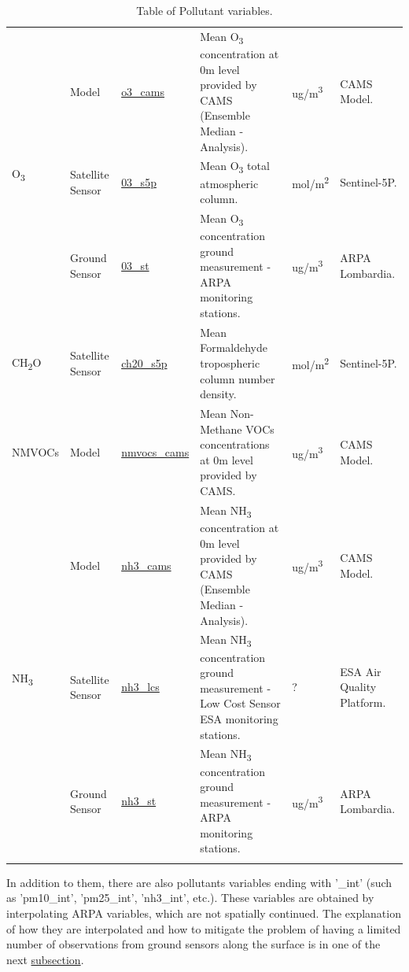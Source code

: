 \begin{center}
\begin{longtable}{ |p{2.3cm}|p{1.5cm}|p{2.3cm}|p{4cm}|p{1.2cm}|p{2.3cm}| }
\multirow{3}{4em}{O\textsubscript{3}} & Model  & \underline{o3\_cams} & Mean O\textsubscript{3} concentration at 0m level provided by CAMS  (Ensemble Median - Analysis).\par & ug/m\textsuperscript{3} & CAMS Model.\\ 
& Satellite \newline Sensor  & \underline{03\_s5p} &  Mean O\textsubscript{3} total atmospheric column.\par  & mol/m\textsuperscript{2} & Sentinel-5P.\\ 
& Ground \newline Sensor & \underline{03\_st} &  Mean O\textsubscript{3} concentration ground measurement - ARPA monitoring stations.  \par& ug/m\textsuperscript{3} & ARPA \newline Lombardia.\\ 
 \hline
 
 \multirow{1}{4em}{CH\textsubscript{2}O}& Satellite \newline Sensor  & \underline{ch20\_s5p} &  Mean Formaldehyde tropospheric column number density. \par & mol/m\textsuperscript{2} & Sentinel-5P.\\ \hline
 
\multirow{1}{4em}{NMVOCs}& Model  & \underline{nmvocs\_cams} & Mean Non-Methane VOCs concentrations at 0m level provided by CAMS.\par & ug/m\textsuperscript{3} & CAMS Model.\\ \hline

\multirow{3}{4em}{NH\textsubscript{3}} & Model  & \underline{nh3\_cams} & Mean NH\textsubscript{3} concentration at 0m level provided by CAMS  (Ensemble Median - Analysis).\par & ug/m\textsuperscript{3} & CAMS Model.\\ 
& Satellite \newline Sensor  & \underline{nh3\_lcs} &  Mean NH\textsubscript{3} concentration ground measurement - Low Cost Sensor ESA monitoring stations. \par  & ? & ESA Air Quality Platform.\\ 
& Ground \newline Sensor & \underline{nh3\_st} &  Mean NH\textsubscript{3} concentration ground measurement - ARPA monitoring stations. \par & ug/m\textsuperscript{3} & ARPA \newline Lombardia.\\ \hline
\caption{Table of Pollutant variables.}
\end{longtable}
\end{center}
In addition to them, there are also pollutants variables ending with '\_int' (such as 'pm10\_int', 'pm25\_int', 'nh3\_int', etc.). These variables are obtained by interpolating ARPA variables, which are not spatially continued. The explanation of how they are interpolated and how to mitigate the problem of having a limited number of observations from ground sensors along the surface is in one of the next \hyperref[subsec:nan]{subsection}.
